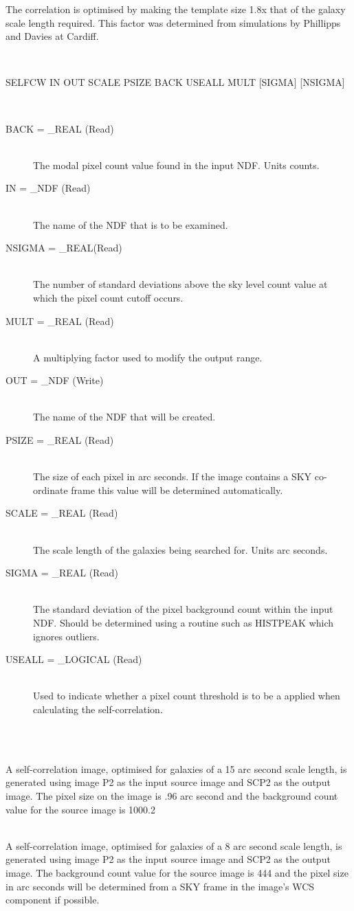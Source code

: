 \documentclass[twoside,11pt]{article}
\newcommand{\LineBreak}{\hfill\break\hbox{}\qquad}
\newlength{\sstexampleslength}
\newcommand{\sstusage}[1]{\item[Usage:] \mbox{}
\\[1.3ex]{\raggedright \ssttt #1}}
\newcommand{\sstparameters}[1]{
   \item[Parameters:] \mbox{} \\
   \vspace{-3.5ex}
   \begin{description}
      #1
   \end{description}
}
\newcommand{\sstexamples}[1]{
   \item[Examples:] \mbox{} \\
   \vspace{-3.5ex}
   \begin{description}
      #1
   \end{description}
}
\newcommand{\sstsubsection}[1]{ \item[{#1}] \mbox{} \\}
\newcommand{\sstexamplesubsection}[2]{\sloppy
\item[\parbox{\sstexampleslength}{\ssttt #1}] \mbox{} \vspace{1.0ex}
\\ #2 }
\newcommand{\sstusage}[1]{\item[Usage:]
      \begin{description}
         {\ssttt #1}
      \end{description}
      \\
   }
\newcommand{\sstparameters}[1]{
      \item[Parameters:] \\
      \begin{description}
         #1
      \end{description}
      \\
   }
\newcommand{\sstexamples}[1]{
      \item[Examples:] \\
      \begin{description}
         #1
      \end{description}
      \\
   }
\newcommand{\sstsubsection}[1]{\item[{#1}]}
\newcommand{\sstexamplesubsection}[2]{\item[{\ssttt #1}] #2}
\begin{document}
{{      The correlation is optimised by making the template size 1.8x
      that of the galaxy scale length required. This factor was
      determined from simulations by Phillipps and Davies at Cardiff.
   }
   \sstusage{
      SELFCW IN OUT SCALE PSIZE BACK USEALL MULT [SIGMA] [NSIGMA]
   }
   \sstparameters{
      \sstsubsection{
         BACK = \_REAL (Read)
      }{
         The modal pixel count value found in the input NDF.
         Units counts.
      }
      \sstsubsection{
         IN = \_NDF (Read)
      }{
         The name of the NDF that is to be examined.
      }
      \sstsubsection{
         NSIGMA = \_REAL(Read)
      }{
         The number of standard deviations above the sky level
         count value at which the pixel count cutoff occurs.
      }
      \sstsubsection{
         MULT = \_REAL (Read)
      }{
         A multiplying factor used to modify the output range.
      }
      \sstsubsection{
         OUT = \_NDF (Write)
      }{
         The name of the NDF that will be created.
      }
      \sstsubsection{
         PSIZE = \_REAL (Read)
      }{
         The size of each pixel in arc seconds.  If the image contains
         a SKY co-ordinate frame this value will be determined
         automatically.
      }
      \sstsubsection{
         SCALE = \_REAL (Read)
      }{
         The scale length of the galaxies being searched for.
         Units arc seconds.
      }
      \sstsubsection{
         SIGMA = \_REAL (Read)
      }{
         The standard deviation of the pixel background count within the
         input NDF. Should be determined using a routine such as
         HISTPEAK which ignores outliers.
      }
      \sstsubsection{
         USEALL = \_LOGICAL (Read)
      }{
         Used to indicate whether a pixel count threshold is to
         be a applied when calculating the self-correlation.
      }
   }
   \sstexamples{
      \sstexamplesubsection{
         selfcw in=p2 out=scp2 scale=15. psize=0.96 back=1000.2
\LineBreak
             useall=true
      }{
         A self-correlation image, optimised for galaxies of a 15 arc
         second scale length, is generated using image P2 as the input
         source image and SCP2 as the output image. The pixel size
         on the image is .96 arc second and the background count value
         for the source image is 1000.2
      }
      \sstexamplesubsection{
         selfcw in=lsbg1 out=lsbg2 scale=8. back=444.  useall=false
\LineBreak
             sigma=12. nsigma=4.
      }{
         A self-correlation image, optimised for galaxies of a 8 arc
         second scale length, is generated using image P2 as the input
         source image and SCP2 as the output image.  The background
         count value for the source image is 444 and the pixel size
         in arc seconds will be determined from a SKY frame in the
         image's WCS component if possible.

}}}
\end{document}
